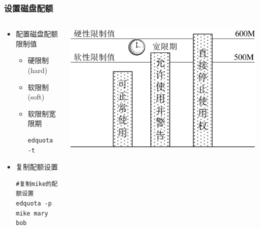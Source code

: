 \documentclass[xcolor=svgnames,presentation]{beamer}
\begin{document}
\begin{frame}[fragile]
\frametitle{设置磁盘配额}
\label{sec-6-3}
\begin{columns}
\begin{column}{0.5\textwidth}
\label{sec-6-3-1}
\begin{itemize}

\item 配置磁盘配额限制值
\label{sec-6-3-2}%
\begin{itemize}

\item 硬限制(hard)
\label{sec-6-3-2-1}%

\item 软限制(soft)
\label{sec-6-3-2-2}%

\item 软限制宽限期\\
\label{sec-6-3-2-3}%
\begin{verbatim}
edquota -t
\end{verbatim}
\end{itemize} %

\item 复制配额设置\\
\label{sec-6-3-3}%
\begin{verbatim}
#复制mike的配额设置
edquota -p mike mary bob
\end{verbatim}
\end{itemize} %
\end{column}
\begin{column}{0.5\textwidth}
\label{sec-6-3-4}

\includegraphics[width=.9\linewidth]{img/quota.png}
\end{column}
\end{columns}
\end{frame}
\end{document}
